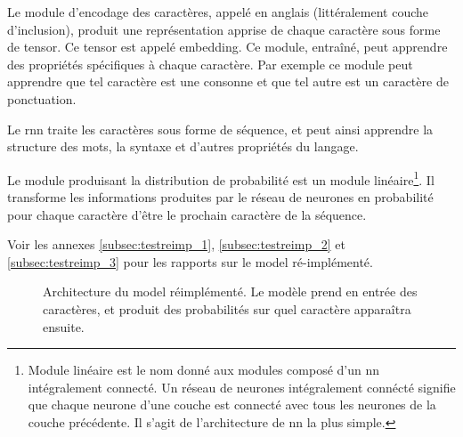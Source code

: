 Le module d'encodage des caractères, appelé  en anglais (littéralement \og couche d'inclusion\fg{}), produit une représentation apprise de chaque caractère sous forme de \gls{tensor}. Ce \gls{tensor} est appelé \gls{embedding}. Ce module, entraîné, peut apprendre des propriétés spécifiques à chaque caractère. Par exemple ce module peut apprendre que tel caractère est une consonne et que tel autre est un caractère de ponctuation. \label{def:embedding}

Le \gls{rnn} traite les caractères sous forme de séquence, et peut ainsi apprendre la structure des mots, la syntaxe et d'autres propriétés du langage.

Le module produisant la distribution de probabilité est un module linéaire\footnote{\og Module linéaire \fg{} est le nom donné aux modules composé d'un \gls{nn} intégralement connecté. Un réseau de neurones intégralement connécté signifie que chaque neurone d'une couche est connecté avec tous les neurones de la couche précédente. Il s'agit de l'architecture de \gls{nn} la plus simple.\label{def:fully_connected}\label{def:lin_module}}.
Il transforme les informations produites par le réseau de neurones en probabilité pour chaque caractère d'être le prochain caractère de la séquence.

Voir les annexes \ref{subsec:testreimp_1}, \ref{subsec:testreimp_2} et \ref{subsec:testreimp_3} pour les rapports sur le \gls{model} ré-implémenté. 

\begin{figure}[h]
	\centering
	\scalebox{1}{}
	\caption[Architecture du  réimplémenté]{Architecture du \gls{model} réimplémenté. Le modèle prend en entrée des caractères, et produit des probabilités sur quel caractère apparaîtra ensuite.}
	\label{fig:reimplement}
\end{figure}
%
